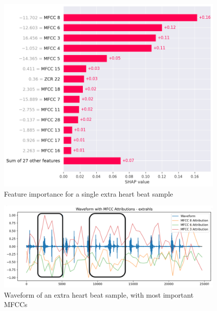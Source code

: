 \begin{figure}[h]
    \centering
    \includegraphics[width=\columnwidth]{../images/extrahls_feature_importance.png}
    \caption{Feature importance for a single extra heart beat sample}
    \label{fig:extrahls_feature_importance}
\end{figure}

\begin{figure}[h]
    \centering
    \includegraphics[width=\columnwidth]{../images/extrahls_waveform.png}
    \caption{Waveform of an extra heart beat sample, with most important MFCCs}
    \label{fig:extrahls_waveform}
\end{figure}
